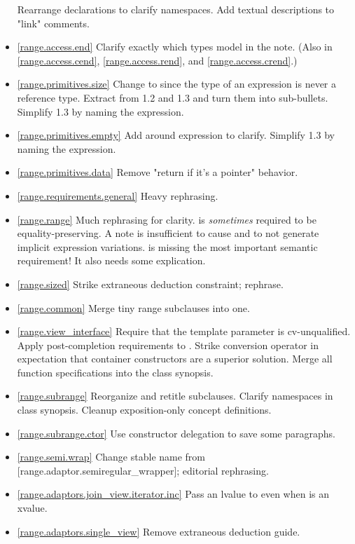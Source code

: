 \begin{itemize}
  Rearrange declarations to clarify namespaces.
  Add textual descriptions to "link" comments.
\item \ref{range.access.end} Clarify exactly which types model 
  in the note. (Also in \ref{range.access.cend}, \ref{range.access.rend},
  and \ref{range.access.crend}.)
\item \ref{range.primitives.size} Change  to
   since the type of an expression is never a reference type.
  Extract  from 1.2 and 1.3 and turn them into
  sub-bullets. Simplify 1.3 by naming the expression.
\item \ref{range.primitives.empty} Add \tcode{()} around expression to clarify.
   Simplify 1.3 by naming the expression.
\item \ref{range.primitives.data}
  Remove "return  if it's a pointer" behavior.
\item \ref{range.requirements.general} Heavy rephrasing.
\item \ref{range.range} Much rephrasing for clarity.
   is \textit{sometimes} required to be equality-preserving.
  A note is insufficient to cause  and 
  to not generate implicit expression variations.
   is missing the most important
  semantic requirement! It also needs some explication.
\item \ref{range.sized} Strike extraneous deduction constraint; rephrase.
\item \ref{range.common} Merge tiny range subclauses into one.
\item \ref{range.view_interface} Require that the template parameter 
  is cv-unqualified. Apply post-completion requirements to .
  Strike conversion operator in expectation that container constructors are a
  superior solution.
  Merge all function specifications into the class synopsis.
\item \ref{range.subrange} Reorganize and retitle subclauses.
  Clarify namespaces in class synopsis.
  Cleanup exposition-only concept definitions.
\item \ref{range.subrange.ctor} Use constructor delegation to save some
  paragraphs.
\item \ref{range.semi.wrap} Change stable name from
  [range.adaptor.semiregular_wrapper]; editorial rephrasing.
\item \ref{range.adaptors.join_view.iterator.inc} Pass an lvalue to
   even when  is an xvalue.
\item \ref{range.adaptors.single_view} Remove extraneous 
  deduction guide.
\end{itemize}

